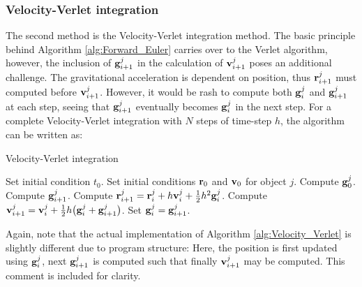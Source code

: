 \documentclass[reprint,english]{revtex4-1}
\begin{document}
\subsubsection{Velocity-Verlet integration}
The second method is the Velocity-Verlet integration method. The basic principle behind Algorithm \ref{alg:Forward_Euler} carries over to the Verlet algorithm, however, the inclusion of \(\vb{g}_{i+1}^j\) in the calculation of \(\vb{v}_{i+1}^j\) poses an additional challenge. The gravitational acceleration is dependent on position, thus \(\vb{r}_{i+1}^j\) must computed before \(\vb{v}_{i+1}^j\). However, it would be rash to compute both \(\vb{g}_i^j\) and \(\vb{g}_{i+1}^j\) at each step, seeing that \(\vb{g}_{i+1}^j\) eventually becomes \(\vb{g}_i^j\) in the next step. For a complete Velocity-Verlet integration with \(N\) steps of time-step \(h\), the algorithm can be written as:
\begin{algorithm}[H]
\caption{Velocity-Verlet integration}\label{alg:Velocity_Verlet}
\begin{algorithmic}[1]
\State Set initial condition \(t_0\).
	\State Set initial conditions \(\vb{r}_0\) and \(\vb{v}_0\) for object \(j\).
	\State Compute \(\vb{g}_0^j\).
\EndFor
{}
		\State Compute \(\vb{g}_{i+1}^j\).
		\State Compute \(\vb{r}_{i+1}^j=\vb{r}_i^j+h\vb{v}_i^j+\frac{1}{2}h^2\vb{g}_i^j\).
		\State Compute \(\vb{v}_{i+1}^j=\vb{v}_i^j+\frac{1}{2}h\big(\vb{g}_i^j+\vb{g}_{i+1}^j\big)\).
		\State Set \(\vb{g}_i^j=\vb{g}_{i+1}^j\).
	\EndFor
\EndFor
\end{algorithmic}
\end{algorithm}
Again, note that the actual implementation of Algorithm \ref{alg:Velocity_Verlet} is slightly different due to program structure: Here, the position is first updated using \(\vb{g}_i^j\), next \(\vb{g}_{i+1}^j\) is computed such that finally \(\vb{v}_{i+1}^j\) may be computed. This comment is included for clarity.
\end{document}
